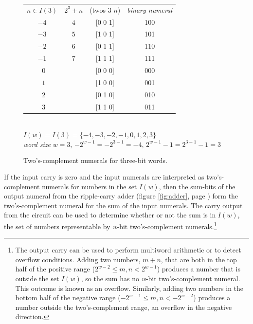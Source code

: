 \begin{figure}
\begin{tabular}{cccc}
 $n \in I(3)$ & $2^3+n$  & \textsf{(twos $3$ $n$)}   & \emph{binary numeral} \\
 $-4$         & $4$      & \textsf{[0 0 1]}          & 100                   \\
 $-3$         & $5$      & \textsf{[1 0 1]}          & 101                   \\
 $-2$         & $6$      & \textsf{[0 1 1]}          & 110                   \\
 $-1$         & $7$      & \textsf{[1 1 1]}          & 111                   \\
 $~~0$        &          & \textsf{[0 0 0]}          & 000                   \\
 $~~1$        &          & \textsf{[1 0 0]}          & 001                   \\
 $~~2$        &          & \textsf{[0 1 0]}          & 010                   \\
 $~~3$        &          & \textsf{[1 1 0]}          & 011                   \\
\end{tabular}
\\ $I(w) = I(3) = \{-4, -3, -2, -1, 0, 1, 2, 3\}$
\\ \emph{word size} $w = 3$, $-2^{w-1} = -2^{3-1}=-4$, $2^{w-1}-1=2^{3-1}-1=3$
\caption{Two's-complement numerals for three-bit words.}
\label{fig:2s-comp-3bit}
\end{figure}

If the input carry is zero and
the input numerals are interpreted
as two's-complement numerals for numbers in the set $I(w)$,
then the sum-bits of the output numeral from the ripple-carry adder
(figure \ref{fig:adder}, page \pageref{fig:adder})
form the two's-complement numeral for the sum of the input numerals.
The carry output from the circuit can be used to determine
whether or not the sum is in $I(w)$, the set of numbers representable
by \emph{w}-bit two's-complement numerals.\footnote{The
output carry can be used to perform multiword arithmetic
or to detect overflow conditions. Adding two numbers, $m+n$,
that are both in the top half of the positive range
($2^{w-2} \leq m, n < 2^{w-1}$) produces a number that is
outside the set $I(w)$, so the sum has no \emph{w}-bit two's-complement numeral.
This outcome is known as an overflow.
Similarly, adding two numbers in the bottom half of the
negative range ($-2^{w-1} \leq m,n < -2^{w-2}$)
produces a number outside the two's-complement range, an overflow in the negative direction.}

